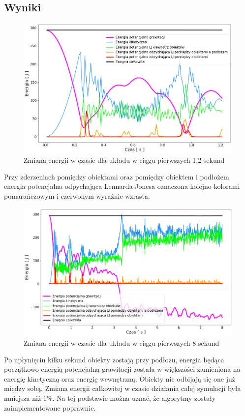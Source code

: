 \documentclass[12pt, letterpaper]{report}
\begin{document}
    \subsection{Wyniki}
    \begin{figure}[H]
        \centering
        \includegraphics[width=14cm]{energy_test_0to2s}
        \caption{Zmiana energii w czasie dla układu w ciągu pierwszych 1.2 sekund}
    \end{figure}

    Przy zderzeniach pomiędzy obiektami oraz pomiędzy obiektem i podłożem energia potencjalna
    odpychająca Lennarda-Jonesa oznaczona kolejno kolorami pomarańczowym i czerwonym
    wyraźnie wzrasta.
    \begin{figure}[H]
        \centering
        \includegraphics[width=14.6cm]{energy_test_0to8s}
        \caption{Zmiana energii w czasie dla układu w ciągu pierwszych 8 sekund}
    \end{figure}
    
    Po upłynięciu kilku sekund obiekty zostają przy podłożu, energia będąca początkowo energią
    potencjalną grawitacji została w większości zamieniona na energię kinetyczną oraz energię
    wewnętrzną. Obiekty nie odbijają się one już między sobą.
    Zmiana energii całkowitej w czasie działania całej symulacji była mniejsza niż $1\%$. Na tej
    podstawie można uznać, że algorytmy zostały zaimplementowane poprawnie.
\end{document}

